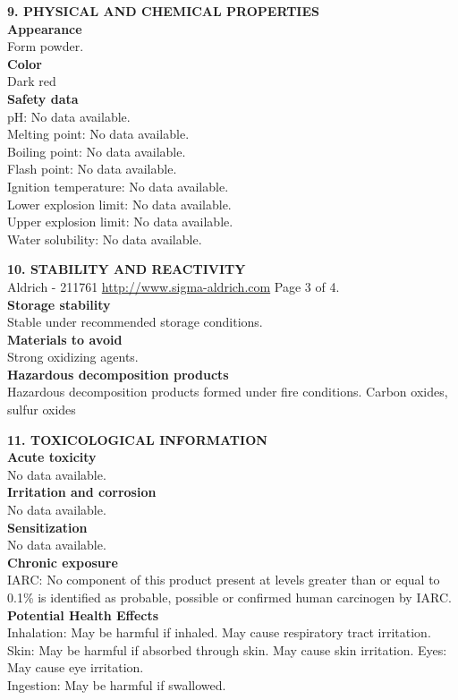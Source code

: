 \begin{multicols*}{2}
\begin{flushleft}
\begin{sans}
\textbf{9. PHYSICAL AND CHEMICAL PROPERTIES}\\
\textbf{Appearance}\\
Form powder.\\
\textbf{Color}\\
Dark red\\
\textbf{Safety data}\\
pH: No data available.\\
Melting point: No data available.\\
Boiling point: No data available.\\
Flash point: No data available.\\
Ignition temperature: No data available.\\
Lower explosion limit: No data available.\\
Upper explosion limit: No data available.\\
Water solubility: No data available.

\textbf{10. STABILITY AND REACTIVITY}\\
Aldrich - 211761 \url{http://www.sigma-aldrich.com} Page 3 of 4.\\
\textbf{Storage stability}\\
Stable under recommended storage conditions.\\
\textbf{Materials to avoid}\\
Strong oxidizing agents.\\
\textbf{Hazardous decomposition products}\\
Hazardous decomposition products formed under fire conditions.
Carbon oxides, sulfur oxides

\textbf{11. TOXICOLOGICAL INFORMATION}\\
\textbf{Acute toxicity}\\
No data available.\\
\textbf{Irritation and corrosion}\\
No data available.\\
\textbf{Sensitization}\\
No data available.\\
\textbf{Chronic exposure}\\
IARC: No component of this product present at levels greater than or equal to 0.1\% is identified as probable, possible or confirmed human carcinogen by IARC.\\
\textbf{Potential Health Effects}\\
Inhalation: May be harmful if inhaled. May cause respiratory tract irritation.\\
Skin: May be harmful if absorbed through skin. May cause skin irritation.
Eyes: May cause eye irritation.\\
Ingestion: May be harmful if swallowed.


\end{sans}
\end{flushleft}
\end{multicols*}
